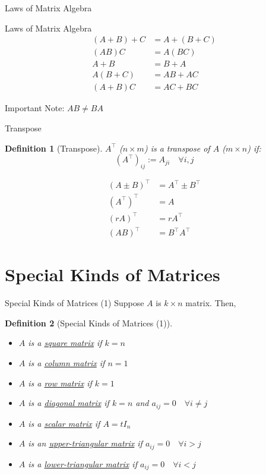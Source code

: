 \documentclass[a4paper,11pt]{article}
\newtheorem{defn}{Definition}
\begin{document}
\begin{frame}[t]{Laws of Matrix Algebra}
	\begin{block}
		{Laws of Matrix Algebra}
		\begin{align*}
				(A+B)+C &= A+(B+C) \tag{Associative Law for Addition}\\
				(AB)C&=A(BC)\tag{Associative Law for Multiplication}\\
				A+B &= B+A \tag{Commutative Law for Addition}\\
				A(B+C)&=AB+AC \tag{Distributive Law}\\
				(A+B)C&=AC+BC \tag{Distributive Law}
		\end{align*}
	\end{block}
	Important Note: $AB\neq BA$
\end{frame}

\begin{frame}[t]{Transpose}
	\begin{defn}
		[Transpose]
		$A^\intercal$ ($n\times m$) is a transpose of $A$ ($m\times n$) if: \[
			(A^\intercal)_{ij} := A_{ji}\quad \forall i,j
		\]
	\end{defn}
	\begin{align*}
		(A\pm B)^\intercal &= A^\intercal \pm B^\intercal\\
		(A^\intercal)^\intercal &= A\\
		(rA)^\intercal &= r A^\intercal\\
		(AB)^\intercal &= B^\intercal A^\intercal \tag{Theorem 8.1}
	\end{align*}
\end{frame}

\section{Special Kinds of Matrices} %
\label{sec:special_kinds_of_matrices}
\begin{frame}[t]{Special Kinds of Matrices (1)}
	Suppose $A$ is $k\times n$ matrix. Then,
	\begin{defn}
		[Special Kinds of Matrices (1)]
		\begin{itemize}
			\item $A$ is a \uline{square matrix} if $k=n$
			\item $A$ is a \uline{column matrix} if $n=1$
			\item $A$ is a \uline{row matrix} if $k=1$
			\item $A$ is a \uline{diagonal matrix} if $k=n$ and $a_{ij}=0\quad \forall i\neq j$
			\item $A$ is a \uline{scalar matrix} if $A=tI_n$
			\item $A$ is an \uline{upper-triangular matrix} if $a_{ij}=0\quad\forall i>j$
			\item $A$ is a \uline{lower-triangular matrix} if $a_{ij}=0\quad\forall i<j$
		\end{itemize}
	\end{defn}
\end{frame}
\end{document}
